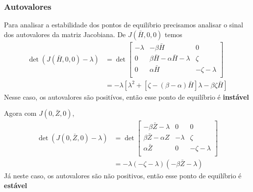 \documentclass[xcolor=dvipsnames, aspectratio=169]{beamer}
\begin{document}
    \begin{frame}
        \frametitle{Autovalores}
        Para analisar a estabilidade dos pontos de equilibrio precisamos analisar o sinal dos autovalores da matriz Jacobiana. De $J(\bar H, 0, 0)$ temos
        \[
            \begin{aligned}
                \det (J(\bar H, 0, 0) - \lambda) &= \det
                \begin{bmatrix}
                    -\lambda & -\beta \bar H & 0\\
                    0 & \beta \bar H - \alpha \bar H - \lambda & \zeta\\
                    0 & \alpha \bar H & -\zeta - \lambda\\
                \end{bmatrix}\\
                &= -\lambda\left[ \lambda^2 + [\zeta - (\beta - \alpha)\bar H]\lambda - \beta\zeta\bar H \right]
            \end{aligned}
        \]
        Nesse caso, os autovalores são positívos, então esse ponto de equilíbrio é \textbf{instável}
    \end{frame}
    \begin{frame}
        Agora com $J(0, \bar Z, 0)$,
        \[
            \begin{aligned}
                \det (J(0, \bar Z, 0) - \lambda) &= \det
                \begin{bmatrix}
                    -\beta \bar Z - \lambda & 0 & 0\\
                    \beta \bar Z - \alpha Z & - \lambda & \zeta\\
                    \alpha \bar Z & 0 & -\zeta - \lambda\\
                \end{bmatrix}\\
                &= -\lambda (-\zeta - \lambda)(-\beta \bar Z - \lambda)
            \end{aligned}
        \]
        Já neste caso, os autovalores são não positivos, então esse ponto de equilíbrio é \textbf{estável}
    \end{frame}
\end{document}
